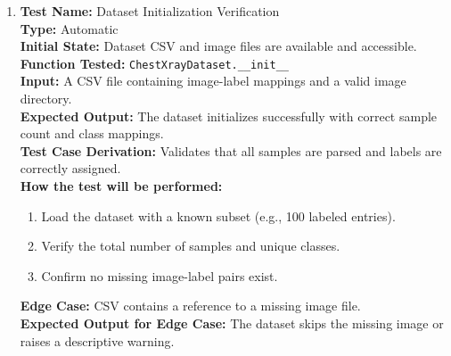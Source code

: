 \documentclass[12pt, titlepage]{article}
\begin{document}
\begin{enumerate}
  \item \textbf{Test Name:} Dataset Initialization Verification\\
    \textbf{Type:} Automatic\\
    \textbf{Initial State:} Dataset CSV and image files are available and accessible.\\
    \textbf{Function Tested:} \verb|ChestXrayDataset.__init__|\\
    \textbf{Input:} A CSV file containing image-label mappings and a valid image directory.\\
    \textbf{Expected Output:} The dataset initializes successfully with correct sample count and class mappings.\\
    \textbf{Test Case Derivation:} Validates that all samples are parsed and labels are correctly assigned.\\
    \textbf{How the test will be performed:}
    \begin{enumerate}
      \item Load the dataset with a known subset (e.g., 100 labeled entries).
      \item Verify the total number of samples and unique classes.
      \item Confirm no missing image-label pairs exist.
    \end{enumerate}
    \textbf{Edge Case:} CSV contains a reference to a missing image file.\\
    \textbf{Expected Output for Edge Case:} The dataset skips the missing image or raises a descriptive warning.\\
    \vspace{1em}


\end{enumerate}
\end{document}
